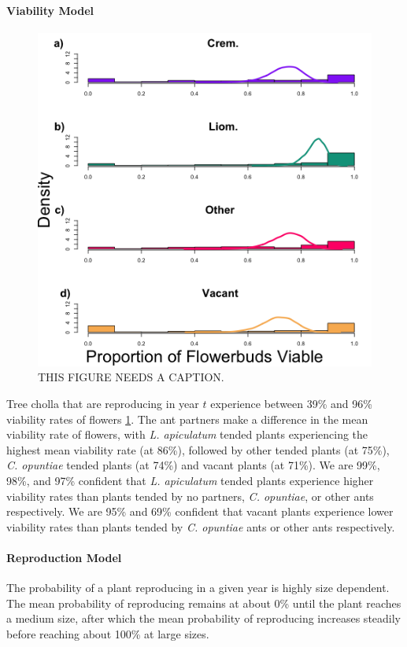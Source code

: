 \documentclass[11pt]{article}
\begin{document}
\paragraph{Viability Model}
\begin{figure}[H]
	\includegraphics[width=0.95\linewidth]{Figures/ViabHist.png}
	\caption{THIS FIGURE NEEDS A CAPTION.}
	\label{fig:viab}
\end{figure}
Tree cholla that are reproducing in year $t$ experience between 39\% and 96\% viability rates of flowers \ref{fig:viab}.
The ant partners make a difference in the mean viability rate of flowers, with \textit{L. apiculatum} tended plants experiencing the highest mean viability rate (at 86\%), followed by other tended plants (at 75\%), \textit{C. opuntiae} tended plants (at 74\%) and vacant plants (at 71\%).
We are 99\%, 98\%, and 97\% confident that \textit{L. apiculatum} tended plants experience higher viability rates than plants tended by no partners, \textit{C. opuntiae}, or other ants respectively.
We are 95\% and 69\% confident that vacant plants experience lower viability rates than plants tended by \textit{C. opuntiae} ants or other ants respectively.

\paragraph{Reproduction Model}
The probability of a plant reproducing in a given year is highly size dependent. 
The mean probability of reproducing remains at about 0\% until the plant reaches a medium size, after which the mean probability of reproducing increases steadily before reaching about 100\% at large sizes. 
\end{document}
